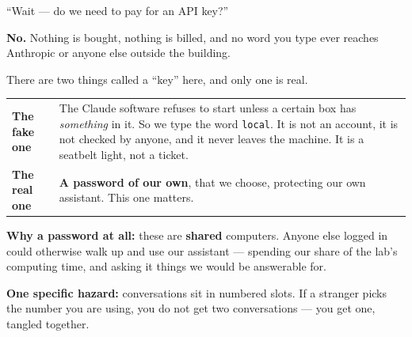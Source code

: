 \documentclass[aspectratio=169]{beamer}
\newcommand{\keybox}[1]{%
  \begin{center}
  \colorbox{black!8}{\parbox{0.92\textwidth}{\centering #1}}
  \end{center}}
\newcommand{\goodbox}[1]{%
  \begin{center}
  \colorbox{green!12}{\parbox{0.92\textwidth}{\centering #1}}
  \end{center}}
\begin{document}
\begin{frame}{``Wait --- do we need to pay for an API key?''}

\goodbox{\large \textbf{No.} Nothing is bought, nothing is billed, and no word you type ever
reaches Anthropic or anyone else outside the building.}

\vspace{0.5em}
{\small There are two things called a ``key'' here, and only one is real.}

\begin{center}
\scriptsize
\renewcommand{\arraystretch}{1.3}
\begin{tabular}{@{}p{}p{}@{}}
\toprule
\textbf{The fake one} & The Claude software refuses to start unless a certain box has \emph{something}
in it. So we type the word \texttt{local}. It is not an account, it is not checked by anyone, and it
never leaves the machine. It is a seatbelt light, not a ticket. \\[0.5em]
\textbf{The real one} & \textbf{A password of our own}, that we choose, protecting our own
assistant. This one matters. \\
\bottomrule
\end{tabular}
\end{center}

\vspace{0.5em}
\keybox{\small \textbf{Why a password at all:} these are \textbf{shared} computers. Anyone else
logged in could otherwise walk up and use our assistant --- spending our share of the lab's
computing time, and asking it things we would be answerable for.}

\vspace{0.4em}
{\small \textbf{One specific hazard:} conversations sit in numbered slots. If a stranger picks the
number you are using, you do not get two conversations --- you get one, tangled together.}

\end{frame}
\end{document}
